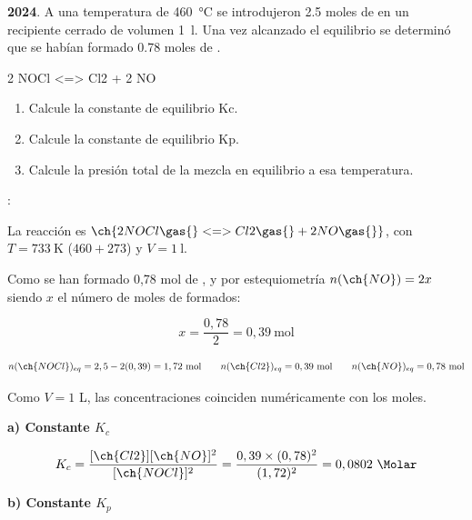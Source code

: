 \begin{exerciseEVAU}
    \textbf{2024}. A una temperatura de \SI{460}{\celsius}  se introdujeron \num{2,5} moles de  en un recipiente cerrado de volumen \SI{1}{\litre}.
    Una vez alcanzado el equilibrio se determinó que se habían formado \num{0,78} moles de .
    \begin{reaction*}
        2 NOCl \gas{} <=> Cl2 \gas{} + 2 NO \gas{}
    \end{reaction*}
    \begin{enumerate}[label=\letraminuscula]
        \item Calcule la constante de equilibrio Kc.
        \item Calcule la constante de equilibrio Kp.
        \item Calcule la presión total de la mezcla en equilibrio a esa temperatura.
    \end{enumerate}

    \datos{}: \ctegases{}

    \begin{solu}

        La reacción es \(\ch{2 NOCl \gas{} <=> Cl2 \gas{} + 2 NO \gas{}}\), con \(T = \SI{733}{\kelvin}\) (\(460+273\)) y \(V = \SI{1}{\litre}\).

        Como se han formado 0,78 mol de , y por estequiometría \(n(\ch{NO}) = 2x\) siendo \(x\) el número de moles de  formados:

        \begin{equation*}
            x = \dfrac{0,78}{2} = 0,39 \ \text{mol}
        \end{equation*}

        \begin{equation*}
            n(\ch{NOCl})_{eq} = 2,5 - 2(0,39) = 1,72 \ \text{mol} \qquad n(\ch{Cl2})_{eq} = 0,39 \ \text{mol} \qquad n(\ch{NO})_{eq} = 0,78 \ \text{mol}
        \end{equation*}

        Como \(V = 1\) L, las concentraciones coinciden numéricamente con los moles.

        \textbf{a) Constante \(K_c\)}

        \begin{equation*}
            K_c = \dfrac{[\ch{Cl2}][\ch{NO}]^2}{[\ch{NOCl}]^2} = \dfrac{0,39 \times (0,78)^2}{(1,72)^2} = 0,0802 \ \si{\Molar}
        \end{equation*}

        \textbf{b) Constante \(K_p\)}


\end{solu}
\end{exerciseEVAU}

